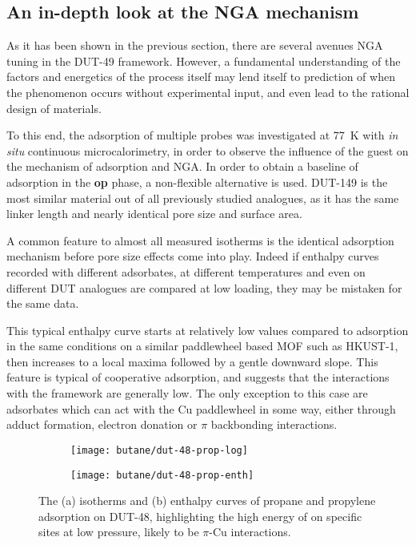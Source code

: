 
\subsection{An in-depth look at the NGA mechanism}%
\label{dut:indepth}

As it has been shown in the previous section, there are 
several avenues NGA tuning in the DUT-49 framework.
However, a fundamental understanding of the factors and 
energetics of the process itself may
lend itself to prediction of when the phenomenon occurs without 
experimental input, and even lead to the rational design of 
materials.

To this end, the adsorption of multiple probes was investigated 
at \SI{77}{\kelvin} with \textit{in situ} continuous microcalorimetry,
in order to observe the influence of the guest on the mechanism of
adsorption and NGA. In order to obtain a baseline of adsorption in 
the \textbf{op} phase, a non-flexible alternative is used. 
DUT-149 is the most similar material out of all previously studied
analogues, as it has the same linker length and nearly identical pore
size and surface area.





A common feature to almost all measured isotherms is the identical
adsorption mechanism before pore size effects come into play.
Indeed if enthalpy curves recorded with different adsorbates, at different
temperatures and even on different DUT analogues are compared at low 
loading, they may be mistaken for the same data.

This typical enthalpy curve starts at relatively low values compared 
to adsorption in the same conditions on a similar paddlewheel based 
MOF such as HKUST-1, then increases to a local maxima followed
by a gentle downward slope.
This feature is typical of cooperative adsorption, and suggests that
the interactions with the framework are generally low. The only 
exception to this case are adsorbates which can act with the 
Cu paddlewheel in some way, either through adduct formation, 
electron donation or \(\pi\) backbonding interactions. 


\begin{figure}[htb]
    \centering
    \begin{subfigure}{0.5\linewidth}
        \texttt{[image: butane/dut-48-prop-log]}%
        \caption{}\label{dut:fgr:dut-48-prop-log}
    \end{subfigure}%
    \begin{subfigure}{0.5\linewidth}
        \texttt{[image: butane/dut-48-prop-enth]}%
        \caption{}\label{dut:fgr:dut-48-prop-enth}
    \end{subfigure}%
    \caption{The (a) isotherms and (b) enthalpy curves of propane 
    and propylene adsorption on DUT-48, highlighting the high energy
    of  on specific sites at low pressure, likely to be 
    \(\pi\)-Cu interactions.}%
    \label{dut:fgr:dut-48-prop}
\end{figure}
